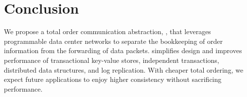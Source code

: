 \section{Conclusion}
\label{sec:conclusion}

We propose a total order communication abstraction, \sys{}, that leverages programmable data center networks to separate the bookkeeping of order information from the forwarding of data packets.
\sys{} simplifies design and improves performance of transactional key-value stores, independent transactions, distributed data structures, and log replication.
With cheaper total ordering, we expect future applications to enjoy higher consistency without sacrificing performance.